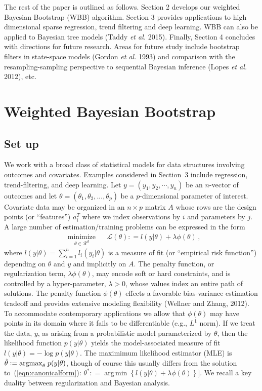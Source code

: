 \documentclass[12pt]{TD-CJS}
\newcommand{\R}{\mathcal{R}}
\newcommand{\defeq}{\mathrel{\mathop:}=}
\DeclareMathOperator*{\argmin}{arg\,min}
\begin{document}
The rest of the paper is outlined as follows. Section 2 develops our weighted Bayesian Bootstrap (WBB) algorithm. Section 3 provides applications to high dimensional sparse regression, trend filtering and deep learning. WBB can also be applied to Bayesian tree models (Taddy {\em et al.} 2015). Finally, Section 4 concludes with directions for future research. Areas for future study include bootstrap filters in state-space models (Gordon {\em et al.}  1993)  and comparison with the resampling-sampling
perspective to sequential Bayesian inference (Lopes {\em et al.} 2012), etc.

\section{Weighted Bayesian Bootstrap}
\subsection{Set up}
We work with a broad class of statistical models for data structures involving outcomes and covariates.
Examples considered in Section~3  include  regression, trend-filtering, and deep learning.
Let  $y=(y_1, y_2, \cdots, y_n)$ be an $n$-vector of outcomes and let $\theta = (\theta_1, \theta_2, ..., \theta_p)$ be a $p$-dimensional parameter of interest. 
Covariate data may be organized in an 
$n \times p$ matrix $A$ whose rows are the design points (or ``features'') $a_i^T$
where we index  observations by $i$ and parameters by $j$.  
A large number of estimation/training  problems can be expressed in the form
\begin{equation}
\label{eqn:canonicalform}
\begin{aligned}
& \underset{\theta \in \R^d}{\text{minimize}}
& &  \mathcal{L}(\theta) \defeq l(y| \theta) + \lambda\phi(\theta) \, ,
\end{aligned}
\end{equation}
where $l(y| \theta) = \sum_{i=1}^n l_i( y_i | \theta )$ is a measure of fit (or ``empirical risk function'') depending on $\theta$ and $y$ and implicitly on $A$.
The penalty function, or regularization term, $\lambda\phi(\theta) $,   
may encode soft or hard constraints, and is controlled by 
a hyper-parameter, $\lambda>0$, whose values index an entire path of solutions. 
The penalty function $\phi(\theta)$ effects a favorable bias-variance 
estimation tradeoff and provides extensive modeling flexibility (Wellner and Zhang, 2012).   
To accommodate contemporary applications we  allow that $\phi(\theta)$ may have points in its domain where it fails to be differentiable (e.g., $L^1$ norm).  
If we treat the data, $y$, as arising from a probabilistic 
model parameterized by $\theta$, then the likelihood function $p(y|\theta)$ yields 
the model-associated measure of fit $l(y| \theta) = -\log p(y|\theta)$.
The maximimum likelihood estimator (MLE) is  $ \hat{\theta} \defeq {\rm arg max}_\theta\; p(y |\theta) $, though
of course this usually differs from the solution to~(\ref{eqn:canonicalform}): $\theta^* \defeq \argmin \left\{ l(y|\theta) + \lambda \phi(\theta)
 \right\}]$.  We recall a key duality between regularization and Bayesian analysis.
\end{document}
